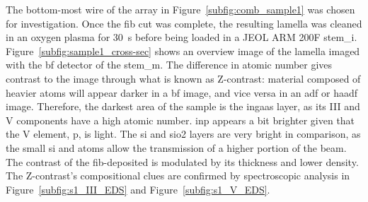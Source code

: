 The bottom-most wire of the array in Figure~\ref{subfig:comb_sample1} was chosen for investigation. Once the \acs{fib} cut was complete, the resulting lamella was cleaned in an oxygen plasma for \qty{30}{s} before being loaded in a JEOL ARM 200F \acl{stem_i}. Figure~\ref{subfig:sample1_cross-sec} shows an overview image of the lamella imaged with the \acf{bf} detector of the \acs{stem_m}. The difference in atomic number gives contrast to the image through what is known as Z-contrast: material composed of heavier atoms will appear darker in a \acs{bf} image, and vice versa in an \acf{adf} or \acf{haadf} image. Therefore, the darkest area of the sample is the \acs{ingaas} layer, as its III and V components have a high atomic number. \acs{inp} appears a bit brighter given that the V element, \acl{p}, is light. The \acs{si} and \acs{sio2} layers are very bright in comparison, as the small \acs{si} and  atoms allow the transmission of a higher portion of the beam. The contrast of the \acs{fib}-deposited  is modulated by its thickness and lower density. The Z-contrast's compositional clues are confirmed by spectroscopic analysis in Figure~\ref{subfig:s1_III_EDS} and Figure~\ref{subfig:s1_V_EDS}.
\par
